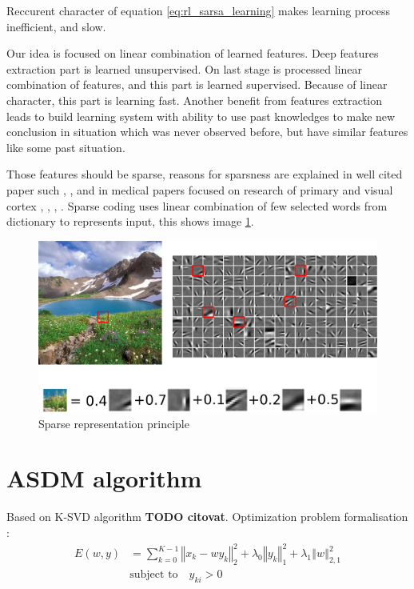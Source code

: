 \documentclass[10pt,a4paper]{article}
\begin{document}
Reccurent character of equation \ref{eq:rl_sarsa_learning} makes learning process inefficient,
and slow.

Our idea is focused on linear combination of learned features. Deep features extraction
part is learned unsupervised. On last stage is processed linear combination of features, and
this part is learned supervised. Because of linear character, this part is learning fast.
Another benefit from features extraction leads to build learning system with ability to use
past knowledges to make new conclusion in situation which was never observed before, but have similar features like some past situation.

Those features should be sparse, reasons for sparsness
are explained in well cited paper such \cite{bib:sparse_01}, \cite{bib:sparse_02},
and in medical papers focused on research of primary and visual cortex \cite{bib:sparse_03}, \cite{bib:sparse_04},
\cite{bib:sparse_05}, \cite{bib:sparse_06}. Sparse coding uses linear combination of
few selected words from dictionary to represents input, this shows image \ref{img:Sparse representation principle}.

\begin{figure}[!h]
  \centering
  \includegraphics[scale=0.3]{../diagrams/sparse_dictionary.png}
  \caption{Sparse representation principle}
  \label{img:Sparse representation principle}
\end{figure}


\section{ASDM algorithm}

Based on K-SVD algorithm {\bf TODO citovat}.
Optimization problem formalisation :
\begin{align*}
E(w, y) &= \sum_{k=0}^{K-1} \left\Vert x_k - wy_k \right\Vert^2_2 + \lambda_0 \left\Vert y_k \right\Vert^2_1 + \lambda_1 \left\Vert w \right\Vert^2_{2,1} \\
&\text{subject to} \quad y_{ki} > 0
\end{align*}
\end{document}
